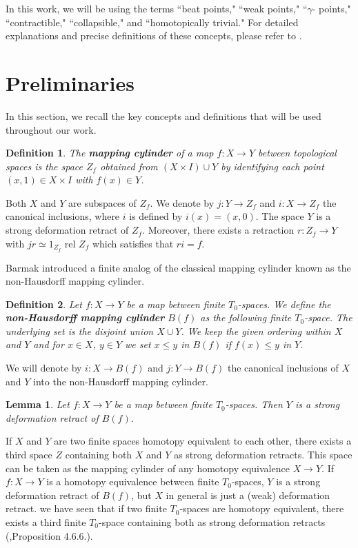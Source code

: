 \documentclass[12pt,a4paper,twoside, reqno, tbtags]{article}
\numberwithin{equation}{section}
\newtheorem{lemma}{Lemma}[section]
\newtheorem{definition}{Definition}[section]
\begin{document}
\noindent In this work, we will be using the terms ``beat points," ``weak points," ``$\gamma$- points," ``contractible," ``collapsible," and ``homotopically trivial." For detailed explanations and precise definitions of these concepts, please refer to \cite{Barmak}.

\section{Preliminaries}

    In this section, we recall the key concepts and definitions that will be used throughout our work.
\begin{definition}\cite{Barmak}\label{a}
    The \textbf{mapping cylinder} of a map $f: X \rightarrow Y$ between topological spaces is the space $Z_f$ obtained from $(X \times I) \cup Y$ by identifying each point $(x, 1) \in X \times I$ with $f(x) \in Y$. 
\end{definition}
    \noindent Both $X$ and $Y$ are subspaces of $Z_f$. We denote by $j: Y \rightarrow Z_f$ and $i: X \rightarrow Z_f$ the canonical inclusions, where $i$ is defined by $i(x) = (x, 0)$. The space $Y$ is a strong deformation retract of $Z_f$. Moreover, there exists a retraction $r : Z_f \rightarrow Y$ with $jr \simeq 1_{Z_f}$ rel $Z_f$ which satisfies that $ri = f$.
    
    \noindent Barmak introduced a finite analog of the classical mapping cylinder known as the non-Hausdorff mapping cylinder.
\begin{definition}\cite{Barmak}\label{b}
    Let $f: X \rightarrow Y$ be a map between finite $T_0$-spaces. We define the \textbf{non-Hausdorff mapping cylinder} $B(f)$ as the following finite $T_0$-space. The underlying set is the disjoint union $X \cup Y$. We keep the given ordering within $X$ and $Y$ and for $x \in X$, $y \in Y$ we set $x \leq y$ in $B(f)$ if $f(x) \leq y$ in $Y$.
\end{definition}
    \noindent We will denote by $i: X \rightarrow B(f)$ and $j: Y \rightarrow B(f)$ the canonical inclusions of $X$ and $Y$ into the non-Hausdorff mapping cylinder.
\begin{lemma}\cite{Barmak}\label{c}
    Let $f: X \rightarrow Y$ be a map between finite $T_0$-spaces. Then $Y$ is a strong deformation retract of $B(f)$.
\end{lemma}
    \noindent If $X$ and $Y$ are two finite spaces homotopy equivalent to each other, there exists a third space $Z$ containing both $X$ and $Y$ as strong deformation retracts. This space can be taken as the mapping cylinder of any homotopy equivalence $X \rightarrow Y$. If $f: X \rightarrow Y$ is a homotopy equivalence between finite $T_0$-spaces, $Y$ is a strong deformation retract of $B(f)$, but $X$ in general is just a (weak) deformation retract. we have seen that if two finite $T_0$-spaces are homotopy equivalent, there exists a third finite $T_0$-space containing both as strong deformation retracts (\cite{Barmak},Proposition 4.6.6.).
    
\end{document}
